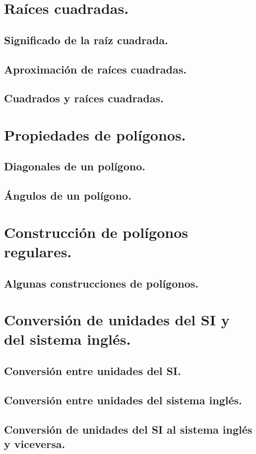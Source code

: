\documentclass[11pt]{book}
\begin{document}
\section{Raíces cuadradas.}
\subsection{Significado de la raíz cuadrada.}
\subsection{Aproximación de raíces cuadradas.}
\subsection{Cuadrados y raíces cuadradas.}

\section{Propiedades de polígonos.}
\subsection{Diagonales de un polígono.}
\subsection{Ángulos de un polígono.}

\section{Construcción de polígonos regulares.}
\subsection{Algunas construcciones de polígonos.}

\section{Conversión de unidades del SI y del sistema inglés.}
\subsection{Conversión entre unidades del SI.}
\subsection{Conversión entre unidades del sistema inglés.}
\subsection{Conversión de unidades del SI al sistema inglés y viceversa.}
\end{document}
